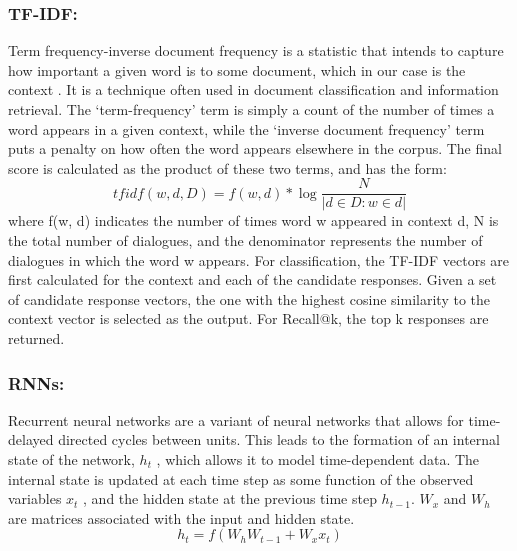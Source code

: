 \documentclass[letterpaper] {article} %
\begin{document}
\subsubsection{TF-IDF:}
Term frequency-inverse document frequency is a statistic that intends to capture how important a given word is to some document, which in our case is the context \cite{ramos2003using}. It is a technique often used in document classification and information retrieval. The ‘term-frequency’ term is simply a count of the number of times a word appears in a given context, while the ‘inverse document frequency’ term puts a penalty on how often the word appears elsewhere in the corpus. The final score is calculated as the product of these two terms, and has the form: 
$$
tfidf(w,d,D) = f(w,d)* \log\frac{N}{|{d \in D:w \in d}|} 
$$
where f(w, d) indicates the number of times word w appeared in context d, N is the total number of dialogues, and the denominator represents the number of dialogues in which the word w appears. For classification, the TF-IDF vectors are first calculated for the context and each of the candidate responses. Given a set of candidate response vectors, the one with the highest cosine similarity to the context vector is selected as the output. For Recall@k, the top k responses are returned. 

\subsubsection{RNNs:}
Recurrent neural networks are a variant of neural networks that allows for time-delayed directed cycles between units\cite{medsker1999recurrent}. This leads to the formation of an internal state of the network, $h_t$ , which allows it to model time-dependent data. The internal state is updated at each time step as some function of the observed variables $x_t$ , and the hidden state at the previous time step $h_{t-1}$. $W_x$ and $W_h$ are matrices associated with the input and hidden state.
$$
h_t = f(W_h W_{t-1} + W_x x_t)
$$
\end{document}

